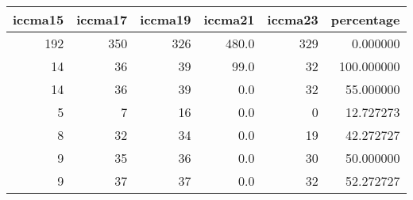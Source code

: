 \begin{tabular}{rrrrrr}
\toprule
 iccma15 &  iccma17 &  iccma19 &  iccma21 &  iccma23 &  percentage \\
\midrule
     192 &      350 &      326 &    480.0 &      329 &    0.000000 \\
      14 &       36 &       39 &     99.0 &       32 &  100.000000 \\
      14 &       36 &       39 &      0.0 &       32 &   55.000000 \\
       5 &        7 &       16 &      0.0 &        0 &   12.727273 \\
       8 &       32 &       34 &      0.0 &       19 &   42.272727 \\
       9 &       35 &       36 &      0.0 &       30 &   50.000000 \\
       9 &       37 &       37 &      0.0 &       32 &   52.272727 \\
\bottomrule
\end{tabular}
